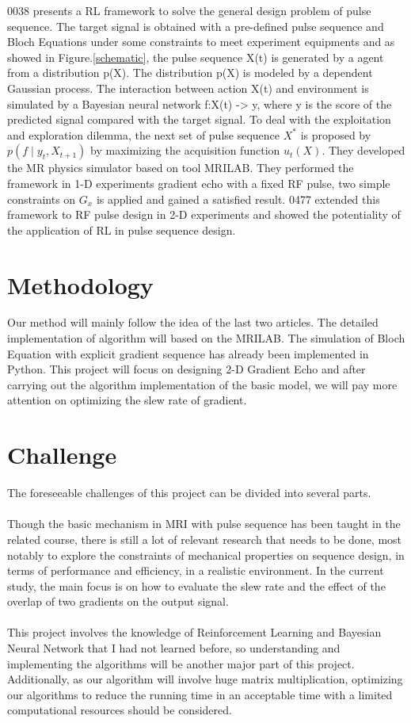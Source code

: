 0038 presents a RL framework to solve the general design problem of pulse sequence. The target signal is obtained with a pre-defined pulse sequence and Bloch Equations under some constraints to meet experiment equipments and as showed in Figure.\ref{schematic}, the pulse sequence X(t) is generated by a agent from a distribution p(X). The distribution p(X) is modeled by a dependent Gaussian process. The interaction between action X(t) and environment is simulated by a Bayesian neural network f:X(t) -> y, where y is the score of the predicted signal compared with the target signal. To deal with the exploitation and exploration dilemma, the next set of pulse sequence $X^*$ is proposed by $p\left(f \mid y_t, X_{t+1}\right)$ by maximizing the acquisition function $u_t(X)$. They developed the MR physics simulator based on tool MRILAB. They performed the framework in 1-D experiments gradient echo with a fixed RF pulse, two simple constraints on $G_x$ is applied and gained a satisfied result. 0477 extended this framework to RF pulse design in 2-D experiments and showed the potentiality of the application of RL in pulse sequence design.

\section{Methodology}

Our method will mainly follow the idea of the last two articles. The detailed implementation of algorithm will based on the MRILAB. The simulation of Bloch Equation with explicit gradient sequence has already been implemented in Python. This project will focus on designing 2-D Gradient Echo and after carrying out the algorithm implementation of the basic model, we will pay more attention on optimizing the slew rate of gradient.

\section{Challenge}

The foreseeable challenges of this project can be divided into several parts.
\\\\
Though the basic mechanism in MRI with pulse sequence has been taught in the related course, there is still a lot of relevant research that needs to be done, most notably to explore the constraints of mechanical properties on sequence design, in terms of performance and efficiency, in a realistic environment. In the current study, the main focus is on how to evaluate the slew rate and the effect of the overlap of two gradients on the output signal.
\\\\
This project involves the knowledge of Reinforcement Learning and Bayesian Neural Network that I had not learned before, so understanding and implementing the algorithms will be another major part of this project. Additionally, as our algorithm will involve huge matrix multiplication, optimizing our algorithms to reduce the running time in an acceptable time with a limited computational resources should be considered.

